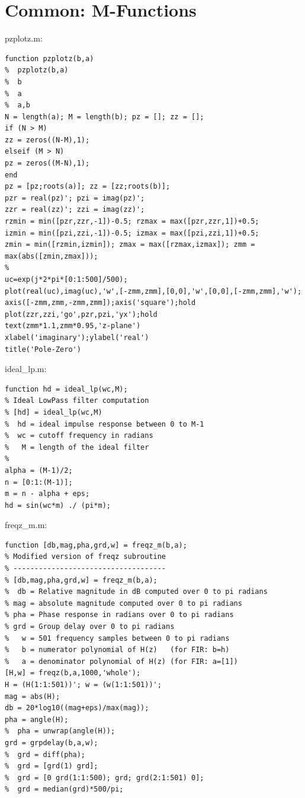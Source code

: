 \documentclass[11pt
  , a4paper
  , article
  , oneside
]{memoir}
\begin{document}
\chapter{Common: M-Functions}
pzplotz.m:
\begin{lstlisting}[style=termstyle]
function pzplotz(b,a)
%  pzplotz(b,a) 
%  b 
%  a
%  a,b
N = length(a); M = length(b); pz = []; zz = []; 
if (N > M)
zz = zeros((N-M),1);
elseif (M > N)
pz = zeros((M-N),1); 
end
pz = [pz;roots(a)]; zz = [zz;roots(b)];
pzr = real(pz)'; pzi = imag(pz)';
zzr = real(zz)'; zzi = imag(zz)';
rzmin = min([pzr,zzr,-1])-0.5; rzmax = max([pzr,zzr,1])+0.5;
izmin = min([pzi,zzi,-1])-0.5; izmax = max([pzi,zzi,1])+0.5;
zmin = min([rzmin,izmin]); zmax = max([rzmax,izmax]); zmm = max(abs([zmin,zmax]));
%
uc=exp(j*2*pi*[0:1:500]/500);
plot(real(uc),imag(uc),'w',[-zmm,zmm],[0,0],'w',[0,0],[-zmm,zmm],'w');
axis([-zmm,zmm,-zmm,zmm]);axis('square');hold
plot(zzr,zzi,'go',pzr,pzi,'yx');hold
text(zmm*1.1,zmm*0.95,'z-plane')
xlabel('imaginary');ylabel('real')
title('Pole-Zero')
\end{lstlisting}

ideal\_lp.m:
\begin{lstlisting}[style=termstyle]
function hd = ideal_lp(wc,M);
% Ideal LowPass filter computation
% [hd] = ideal_lp(wc,M)
%  hd = ideal impulse response between 0 to M-1
%  wc = cutoff frequency in radians
%   M = length of the ideal filter
%
alpha = (M-1)/2;
n = [0:1:(M-1)];
m = n - alpha + eps;
hd = sin(wc*m) ./ (pi*m);
\end{lstlisting}

freqz\_m.m:
\begin{lstlisting}[style=termstyle]
function [db,mag,pha,grd,w] = freqz_m(b,a);
% Modified version of freqz subroutine
% ------------------------------------
% [db,mag,pha,grd,w] = freqz_m(b,a);
%  db = Relative magnitude in dB computed over 0 to pi radians
% mag = absolute magnitude computed over 0 to pi radians 
% pha = Phase response in radians over 0 to pi radians
% grd = Group delay over 0 to pi radians
%   w = 501 frequency samples between 0 to pi radians
%   b = numerator polynomial of H(z)   (for FIR: b=h)
%   a = denominator polynomial of H(z) (for FIR: a=[1])
[H,w] = freqz(b,a,1000,'whole');
H = (H(1:1:501))'; w = (w(1:1:501))';
mag = abs(H);
db = 20*log10((mag+eps)/max(mag));
pha = angle(H);
%  pha = unwrap(angle(H));
grd = grpdelay(b,a,w);
%  grd = diff(pha);
%  grd = [grd(1) grd];
%  grd = [0 grd(1:1:500); grd; grd(2:1:501) 0];
%  grd = median(grd)*500/pi;
\end{lstlisting}
\end{document}
